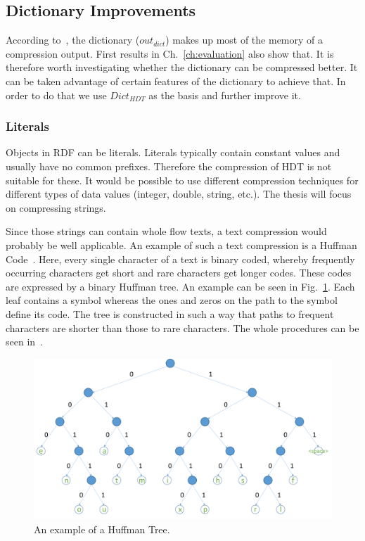 \subsection{Dictionary Improvements}\label{sec:approachDictImprovements}


According to~\cite{hdt}, the dictionary ($out_{dict}$) makes up most of the memory of a compression output. First results in Ch.~\ref{ch:evaluation} also show that. It is therefore worth investigating whether the dictionary can be compressed better. It can be taken advantage of certain features of the dictionary to achieve that. In order to do that we use $Dict_{HDT}$ as the basis and further improve it.

\subsubsection{Literals}\label{sec:approachLiterals}

Objects in RDF can be literals. Literals typically contain constant values and usually have no common prefixes. Therefore the compression of HDT is not suitable for these. It would be possible to use different compression techniques for different types of data values (integer, double, string, etc.). The thesis will focus on compressing strings.

Since those strings can contain whole flow texts, a text compression would probably be well applicable. An example of such a text compression is a Huffman Code~\cite{huffman}. Here, every single character of a text is binary coded, whereby frequently occurring characters get short and rare characters get longer codes. These codes are expressed by a binary Huffman tree. An example can be seen in Fig.~\ref{fig:huffmantree}. Each leaf contains a symbol whereas the ones and zeros on the path to the symbol define its code. The tree is constructed in such a way that paths to frequent characters are shorter than those to rare characters. The whole procedures can be seen in~\cite{huffman}.

\begin{figure}
	\centering
	\includegraphics[width=0.9\linewidth]{figures/4_rdf_specific_features/huffman}
	\caption{An example of a Huffman Tree.}
	\label{fig:huffmantree}
\end{figure}

